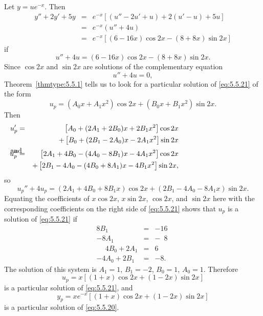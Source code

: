 \begin{examplesolution}
\solution Let $y=ue^{-x}$. Then
\begin{eqnarray*}
  y''+2y'+5y & = & e^{-x}\left[(u''-2u'+u)+2(u'-u)+5u\right] \\
             & = & e^{-x}(u''+4u)                            \\
             & = & e^{-x}\left[(6-16x)\cos2x-(8+8x)\sin2x\right]
\end{eqnarray*}
if
\begin{equation}
  \label{eq:5.5.21}u''+4u=(6-16x)\cos2x-(8+8x)\sin2x.
\end{equation}
Since $\cos2x$ and $\sin2x$ are solutions of the complementary equation
\[
  u''+4u=0,
\]
Theorem~\ref{thmtype:5.5.1} tells us to look for a particular solution of \eqref{eq:5.5.21} of the
form
\[
  u_{p}=(A_{0}x+A_{1}x^{2})\cos2x+(B_{0}x+B_{1}x^{2})\sin2x.
\]
Then
\begin{eqnarray*}
  u_{p}'                 & = & \left[A_{0}+(2A_{1}+2B_{0})x+2B_{1}x^{2}\right]\cos2x         \\
                         &   & +\left[B_{0}+(2B_{1}-2A_{0})x-2A_{1}x^{2}\right]\sin2x        \\
  \arraytext{and}u_{p}'' & = & \left[2A_{1}+4B_{0}-(4A_{0}-8B_{1})x-4A_{1}x^{2}\right]\cos2x \\
                         &   & +\left[2B_{1}-4A_{0}-(4B_{0}+8A_{1})x-4B_{1}x^{2}\right]\sin2x,
\end{eqnarray*}
so
\[
  u_{p}''+4u_{p}=(2A_{1}+4B_{0}+8B_{1}x)\cos2x+(2B_{1}-4A_{0}-8A_{1}x)\sin2x.
\]
Equating the coefficients of $x\cos2x$, $x\sin2x$, $\cos2x$, and $\sin2x$ here with the
corresponding coefficients on the right side of \eqref{eq:5.5.21} shows that $u_{p}$ is a solution
of \eqref{eq:5.5.21} if
\begin{equation}
  \label{eq:5.5.22}
  \begin{array}{rcr}
    8B_{1}                   & = & -16\phantom{.}           \\
    -8A_{1}                  & = & -\phantom{1}8\phantom{.} \\
    \phantom{-}4B_{0}+2A_{1} & = & 6\phantom{.}             \\
    -4A_{0}+2B_{1}           & = & -8.
  \end{array}
\end{equation}
The solution of this system is $A_{1}=1$, $B_{1}=-2$, $B_{0}=1$, $A_{0}=1$. Therefore
\[
  u_{p}=x[(1+x)\cos2x+(1-2x)\sin2x]
\]
is a particular solution of \eqref{eq:5.5.21}, and
\[
  y_{p}=xe^{-x}\left[(1+x)\cos2x+(1-2x)\sin2x\right]
\]
is a particular solution of \eqref{eq:5.5.20}. \bbox


\end{examplesolution}
